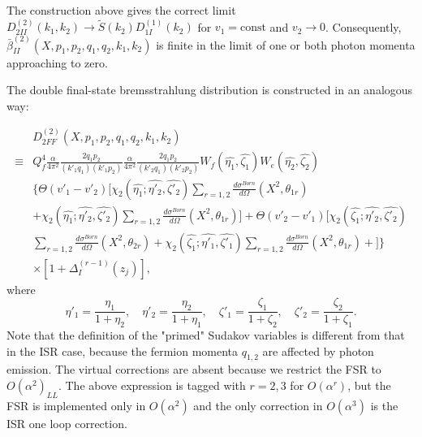 The construction above gives the correct limit $D^{(2)}_{2II}(k_1,k_2)\to\widetilde{S}(k_2)D^{(1)}_{1I}(k_2)$
for $v_1=\text{const}$ and $v_2\to 0$. Consequently, $\bar{\beta}^{(2)}_{II}(X,p_1,p_2,q_1,q_2,k_1,k_2)$ is finite in the limit of one or both photon momenta approaching to zero.

The double final-state bremsstrahlung distribution is constructed in an analogous way:


\begin{align}
&D_{2FF}^{(2)}(X,p_1,p_2,q_1,q_2,k_1,k_2)\nonumber\\
\equiv& Q_f^4 \frac{\alpha}{4\pi^2} \frac{2q_1 p_2}{(k'_1 q_1)(k'_1 p_2)} \frac{\alpha}{4\pi^2}\frac{2q_1p_2}{(k'_2q_1)(k'_2p_2)}W_f(\hat{\eta_1},\hat{\zeta_1})W_e(\hat{\eta_2},\hat{\zeta_2})\nonumber\\
&\Biggl\{\Theta (v'_1-v'_2)\Bigg[\chi_2(\hat{\eta_1};\hat{\eta'_2},\hat{\zeta'_2}) \sum_{r=1,2}\frac{d\sigma^{Born}}{d\Omega}(X^2,\theta_{1r})\nonumber\\
&+\chi_2(\hat{\eta_1};\hat{\eta'_2},\hat{\zeta'_2})\sum_{r=1,2}\frac{d\sigma^{Born}}{d\Omega}(X^2,\theta_{1r})\nonumber \Bigg]+\Theta (v'_2-v'_1) \Bigg[\chi_2(\hat{\zeta_1};\hat{\eta'_2},\hat{\zeta'_2})\nonumber\\ &\sum_{r=1,2}\frac{d\sigma^{Born}}{d\Omega}(X^2,\theta_{2r})+\chi_2(\hat{\zeta_1};\hat{\eta'_1},\hat{\zeta'_1})\sum_{r=1,2}\frac{d\sigma^{Born}}{d\Omega}(X^2,\theta_{1r})+ \Bigg] \Biggr\}\nonumber\\
&\times[1+\Delta^{(r-1)}_I(z_j)],
\end{align}
where
\begin{equation}
\eta'_1=\frac{\eta_1}{1+\eta_2},\quad \eta'_2=\frac{\eta_2}{1+\eta_1},\quad 
\zeta'_1=\frac{\zeta_1}{1+\zeta_2},\quad \zeta'_2=\frac{\zeta_2}{1+\zeta_1}.
\end{equation}
Note that the definition of the "primed" Sudakov variables is different from that in the ISR case, because the fermion momenta $q_{1,2}$ are affected by photon emission. The virtual corrections are absent because we restrict the FSR to $O(\alpha^2)_{LL}$. The above expression is tagged with $r=2,3$ for $O(\alpha^r)$, but the FSR is implemented only in $O(\alpha^2)$ and the only correction in $O(\alpha^3)$ is the ISR one loop correction.

